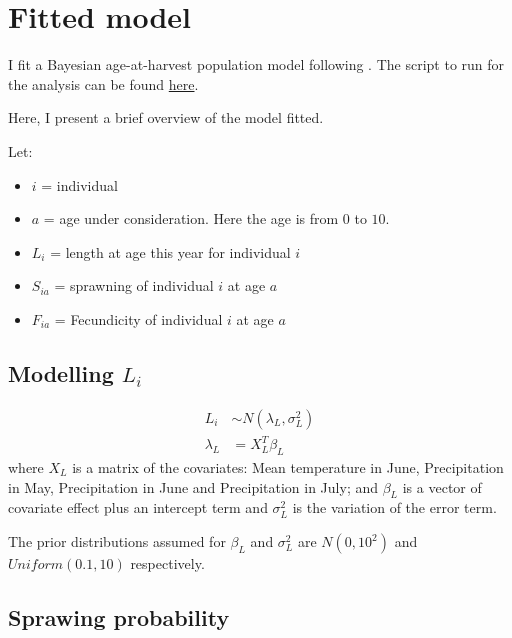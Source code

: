 \documentclass[
]{article}
\begin{document}
\hypertarget{fitted-model}{%
\section{Fitted model}\label{fitted-model}}

I fit a Bayesian age-at-harvest population model following
\cite {skelly2023flexible, baerum2021population}. The script to run for
the analysis can be found
\href{https://github.com/Peprah94/fishyIPMs/blob/main/ModelFitting/modelFit.R}{here}.

Here, I present a brief overview of the model fitted.

Let:

\begin{itemize}
\item
  \(i\) = individual
\item
  \(a\) = age under consideration. Here the age is from \(0\) to \(10\).
\item
  \(L_i\) = length at age this year for individual \(i\)
\item
  \(S_{ia}\) = sprawning of individual \(i\) at age \(a\)
\item
  \(F_{ia}\) = Fecundicity of individual \(i\) at age \(a\)
\end{itemize}

\hypertarget{modelling-l_i}{%
\subsection{\texorpdfstring{Modelling
\(L_i\)}{Modelling L\_i}}\label{modelling-l_i}}

\[
\begin{split}
L_i &\sim N(\lambda_L, \sigma^{2}_{L}) \\
\lambda_L &= X_L^T \beta_L
\end{split}
\] where \(X_L\) is a matrix of the covariates: Mean temperature in
June, Precipitation in May, Precipitation in June and Precipitation in
July; and \(\beta_L\) is a vector of covariate effect plus an intercept
term and \(\sigma^{2}_{L}\) is the variation of the error term.

The prior distributions assumed for \(\beta_L\) and \(\sigma^{2}_{L}\)
are \(N(0, 10^2)\) and \(Uniform(0.1, 10)\) respectively.

\hypertarget{sprawing-probability}{%
\subsection{Sprawing probability}\label{sprawing-probability}}
\end{document}

